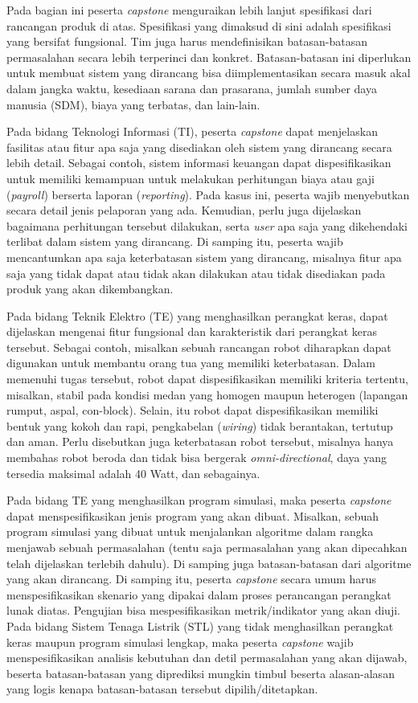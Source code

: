 Pada bagian ini peserta \textit{capstone} menguraikan lebih lanjut spesifikasi dari rancangan produk di atas. Spesifikasi yang dimaksud di sini adalah spesifikasi yang bersifat fungsional. Tim juga harus mendefinisikan batasan-batasan permasalahan secara lebih terperinci dan konkret. Batasan-batasan ini diperlukan untuk membuat sistem yang dirancang bisa diimplementasikan secara masuk akal dalam jangka waktu, kesediaan sarana dan prasarana, jumlah sumber daya manusia (SDM), biaya yang terbatas, dan lain-lain. 

Pada bidang Teknologi Informasi (TI), peserta \textit{capstone} dapat menjelaskan fasilitas atau fitur apa saja yang disediakan oleh sistem yang dirancang secara lebih detail. Sebagai contoh, sistem informasi keuangan dapat dispesifikasikan untuk memiliki kemampuan untuk melakukan perhitungan biaya atau gaji (\textit{payroll}) berserta laporan (\textit{reporting}). Pada kasus ini, peserta wajib menyebutkan secara detail jenis pelaporan yang ada. Kemudian, perlu juga dijelaskan bagaimana perhitungan tersebut dilakukan, serta \textit{user} apa saja yang dikehendaki terlibat dalam sistem yang dirancang. Di samping itu, peserta wajib mencantumkan apa saja keterbatasan sistem yang dirancang, misalnya fitur apa saja yang tidak dapat atau tidak akan dilakukan atau tidak disediakan pada produk yang akan dikembangkan. 

Pada bidang Teknik Elektro (TE) yang menghasilkan perangkat keras, dapat dijelaskan mengenai fitur fungsional dan karakteristik dari perangkat keras tersebut. Sebagai contoh, misalkan sebuah rancangan robot diharapkan dapat digunakan untuk membantu orang tua yang memiliki keterbatasan. Dalam memenuhi tugas tersebut, robot dapat dispesifikasikan memiliki kriteria tertentu, misalkan, stabil pada kondisi medan yang homogen maupun heterogen (lapangan rumput, aspal, con-block). Selain, itu robot dapat dispesifikasikan memiliki bentuk yang kokoh dan rapi, pengkabelan (\textit{wiring}) tidak berantakan, tertutup dan aman. Perlu disebutkan juga keterbatasan robot tersebut, misalnya hanya membahas robot beroda dan tidak bisa bergerak \textit{omni-directional}, daya yang tersedia maksimal adalah 40 Watt, dan sebagainya. 

Pada bidang TE yang menghasilkan program simulasi, maka peserta \textit{capstone} dapat menspesifikasikan jenis program yang akan dibuat. Misalkan, sebuah program simulasi yang dibuat untuk menjalankan algoritme dalam rangka menjawab sebuah permasalahan (tentu saja permasalahan yang akan dipecahkan telah dijelaskan terlebih dahulu). Di samping juga batasan-batasan dari algoritme yang akan dirancang. Di samping itu, peserta \textit{capstone} secara umum harus menspesifikasikan skenario yang dipakai dalam proses perancangan perangkat lunak diatas. Pengujian bisa mespesifikasikan metrik/indikator yang akan diuji. Pada bidang Sistem Tenaga Listrik (STL) yang tidak menghasilkan perangkat keras maupun program simulasi lengkap, maka peserta \textit{capstone} wajib menspesifikasikan analisis kebutuhan dan detil permasalahan yang akan dijawab, beserta batasan-batasan yang diprediksi mungkin timbul beserta alasan-alasan yang logis kenapa batasan-batasan tersebut dipilih/ditetapkan.
